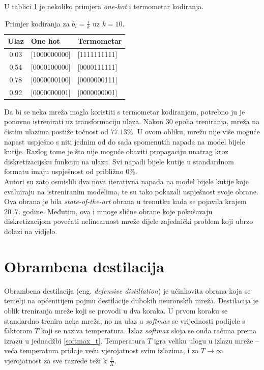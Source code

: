 \documentclass[utf8, diplomski]{fer}
\begin{document}
U tablici \ref{example_encoding} je nekoliko primjera \textit{one-hot} i termometar kodiranja.
\begin{table}[H]
\centering
\begin{tabular}{@{}cll@{}}
\toprule
Ulaz & One hot & Termometar\\ \midrule
0.03 & [1000000000] & [1111111111] \\
0.54 & [0000100000] & [0000111111] \\ 
0.78 & [0000000100] & [0000000111] \\ 
0.92 & [0000000001] & [0000000001] \\ \bottomrule
\end{tabular}
\caption{Primjer kodiranja za $b_{i} = \frac{i}{k}$ uz $k = 10$.}\label{example_encoding}
\end{table}
\par
Da bi se neka mreža mogla koristiti s termometar kodiranjem, potrebno ju je ponovno istrenirati uz transformaciju ulaza. Nakon $30$ epoha treniranja, mreža na čistim ulazima postiže točnost od $77.13\%$. U ovom obliku, mrežu nije više moguće napast uspješno s niti jednim od do sada spomenutih napada na model bijele kutije. Razlog tome je što nije moguće obaviti propagaciju unatrag kroz diskretizacijsku funkciju na ulazu. Svi napadi bijele kutije u standardnom formatu imaju uspješnost od približno $0\%$. \\
Autori su zato osmislili dva nova iterativna napada na model bijele kutije koje evaluiraju na istreniranim modelima, te su tako pokazali uspješnost svoje obrane. Ova obrana je bila \textit{state-of-the-art} obrana u trenutku kada se pojavila krajem $2017.$ godine. Međutim, ova i mnoge slične obrane koje pokušavaju diskretizacijom povećati nelinearnost mreže dijele zajednički problem koji ubrzo dolazi na vidjelo.

\section{Obrambena destilacija}
Obrambena destilacija (eng. \textit{defensive distillation}) je učinkovita obrana koja se temelji na općenitijem pojmu destilacije dubokih neuronskih mreža. Destilacija je oblik treniranja mreže koji se provodi u dva koraka. U prvom koraku se standardno trenira neka mreža, no na ulaz u \textit{softmax} se vrijednosti podijele s faktorom $T$ koji se naziva temperatura. Izlaz \textit{softmax} sloja se onda računa prema izrazu u jednadžbi \ref{softmax_t}. Temperatura $T$ igra veliku ulogu u izlazu mreže -- veća temperatura pridaje veću vjerojatnost svim izlazima, i za $T \rightarrow \infty$ vjerojatnost za sve razrede teži k $\frac{1}{K}$. \par
\end{document}
